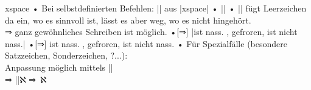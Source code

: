 \begin{frame}[fragile]{xspace}
• Bei selbstdefinierten Befehlen: |\xspace| aus |xspace|
• |\NewDocumentCommand\wasser{}{H₂O\xspace}|%
• |\xspace| fügt Leerzeichen da ein, wo es sinnvoll ist, lässt es aber weg, wo es nicht hingehört.\\
⇒ ganz gewöhnliches Schreiben ist möglich.\pause
•[⇒] |\wasser ist nass. \wasser, gefroren, ist nicht nass.|%
\NewDocumentCommand\wasser{}{H₂O\xspace}%
•[⇒] \wasser ist nass. \wasser, gefroren, ist nicht nass.\pause
• Für Spezialfälle (besondere Satzzeichen, Sonderzeichen, ?...):\\%
 Anpassung möglich mittels ||%
%
\\ ⇒ |\wasser |ℵ ⇒  \wasser ℵ
\•
\end{frame}


